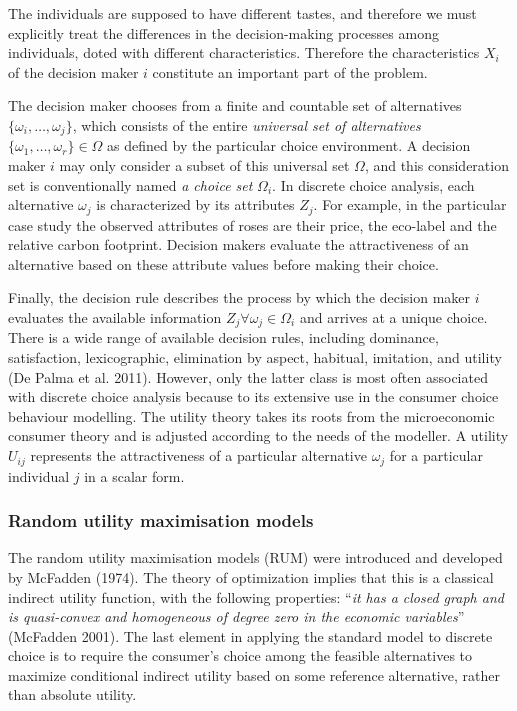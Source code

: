 \documentclass[11pt,]{article}
\begin{document}
The individuals are supposed to have different tastes, and therefore we
must explicitly treat the differences in the decision-making processes
among individuals, doted with different characteristics. Therefore the
characteristics \(X_i\) of the decision maker \(i\) constitute an
important part of the problem.

The decision maker chooses from a finite and countable set of
alternatives \(\{\omega_i, \dots, \omega_j\}\), which consists of the
entire \emph{universal set of alternatives}
\(\{\omega_1, \dots, \omega_r \} \in \Omega\) as defined by the
particular choice environment. A decision maker \(i\) may only consider
a subset of this universal set \(\Omega\), and this consideration set is
conventionally named \emph{a choice set} \(\Omega_i\). In discrete
choice analysis, each alternative \(\omega_j\) is characterized by its
attributes \(Z_j\). For example, in the particular case study the
observed attributes of roses are their price, the eco-label and the
relative carbon footprint. Decision makers evaluate the attractiveness
of an alternative based on these attribute values before making their
choice.

Finally, the decision rule describes the process by which the decision
maker \(i\) evaluates the available information
\(Z_j \forall \omega_j \in \Omega_i\) and arrives at a unique choice.
There is a wide range of available decision rules, including dominance,
satisfaction, lexicographic, elimination by aspect, habitual, imitation,
and utility (De Palma et al. 2011). However, only the latter class is
most often associated with discrete choice analysis because to its
extensive use in the consumer choice behaviour modelling. The utility
theory takes its roots from the microeconomic consumer theory and is
adjusted according to the needs of the modeller. A utility \(U_{ij}\)
represents the attractiveness of a particular alternative \(\omega_j\)
for a particular individual \(j\) in a scalar form.

\hypertarget{random-utility-maximisation-models}{%
\subsubsection{Random utility maximisation
models}\label{random-utility-maximisation-models}}

The random utility maximisation models (RUM) were introduced and
developed by McFadden (1974). The theory of optimization implies that
this is a classical indirect utility function, with the following
properties: ``\emph{it has a closed graph and is quasi-convex and
homogeneous of degree zero in the economic variables}'' (McFadden 2001).
The last element in applying the standard model to discrete choice is to
require the consumer's choice among the feasible alternatives to
maximize conditional indirect utility based on some reference
alternative, rather than absolute utility.
\end{document}
